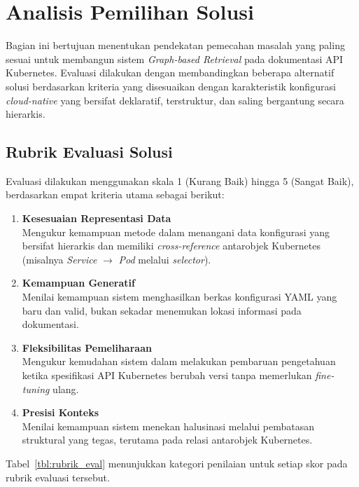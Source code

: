 \section{Analisis Pemilihan Solusi}
Bagian ini bertujuan menentukan pendekatan pemecahan masalah yang paling sesuai untuk membangun sistem \textit{Graph-based Retrieval} pada dokumentasi API Kubernetes. Evaluasi dilakukan dengan membandingkan beberapa alternatif solusi berdasarkan kriteria yang disesuaikan dengan karakteristik konfigurasi \textit{cloud-native} yang bersifat deklaratif, terstruktur, dan saling bergantung secara hierarkis.

\subsection{Rubrik Evaluasi Solusi}
Evaluasi dilakukan menggunakan skala 1 (Kurang Baik) hingga 5 (Sangat Baik), berdasarkan empat kriteria utama sebagai berikut:

\begin{enumerate}[label=\textbf{K\arabic*.}]
    \item \textbf{Kesesuaian Representasi Data} \\
    Mengukur kemampuan metode dalam menangani data konfigurasi yang bersifat hierarkis dan memiliki \textit{cross-reference} antarobjek Kubernetes (misalnya \textit{Service} $\rightarrow$ \textit{Pod} melalui \textit{selector}).

    \item \textbf{Kemampuan Generatif} \\
    Menilai kemampuan sistem menghasilkan berkas konfigurasi YAML yang baru dan valid, bukan sekadar menemukan lokasi informasi pada dokumentasi.

    \item \textbf{Fleksibilitas Pemeliharaan} \\
    Mengukur kemudahan sistem dalam melakukan pembaruan pengetahuan ketika spesifikasi API Kubernetes berubah versi tanpa memerlukan \textit{fine-tuning} ulang.

    \item \textbf{Presisi Konteks} \\
    Menilai kemampuan sistem menekan halusinasi melalui pembatasan struktural yang tegas, terutama pada relasi antarobjek Kubernetes.
\end{enumerate}

Tabel~\ref{tbl:rubrik_eval} menunjukkan kategori penilaian untuk setiap skor pada rubrik evaluasi tersebut.



